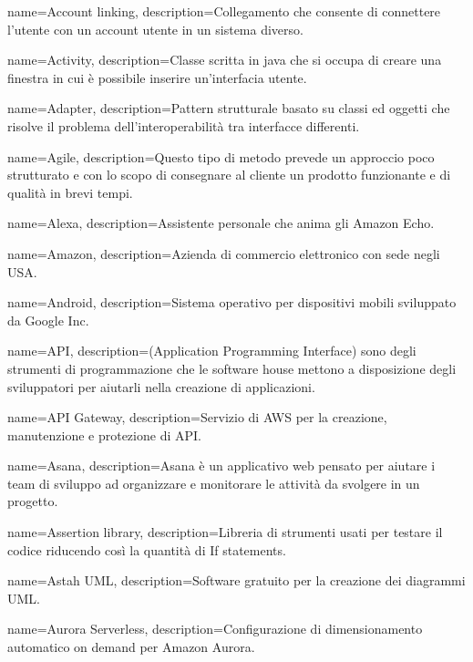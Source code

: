 {
name={Account linking},
description={Collegamento che consente di connettere l’utente con un account utente in un sistema diverso.}
}

{
	name={Activity},
	description={Classe scritta in java che si occupa di creare una finestra in cui è possibile inserire un'interfacia utente.}
}

{
	name={Adapter},
	description={Pattern strutturale basato su classi ed oggetti che risolve il problema dell'interoperabilità tra interfacce differenti.}
}

{
name={Agile},
description={Questo tipo di metodo prevede un approccio poco strutturato e con lo scopo di consegnare al cliente un prodotto funzionante e di qualità in brevi tempi.}
}

{
name={Alexa},
description={Assistente personale che anima gli Amazon Echo.}
}

{
name={Amazon},
description={Azienda di commercio elettronico con sede negli USA.}
}

{
name={Android},
description={Sistema operativo per dispositivi mobili sviluppato da Google Inc.}
}

{
name={API},
description={(Application Programming Interface) sono degli strumenti di programmazione che le software house mettono a disposizione degli sviluppatori per aiutarli
nella creazione di applicazioni.}
}

{
name={API Gateway},
description={Servizio di AWS per la creazione, manutenzione e protezione di API.}
}

{
name={Asana},
description={Asana è un applicativo web pensato per aiutare i team di sviluppo ad organizzare e monitorare le attività da svolgere in un progetto.}
}

{
	name={Assertion library},
	description={Libreria di strumenti usati per testare il codice riducendo così la quantità di If statements.}
}

{
name={Astah UML},
description={Software gratuito per la creazione dei diagrammi UML.}
}

{
name={Aurora Serverless},
description={Configurazione di dimensionamento automatico on demand per Amazon Aurora.}
}

